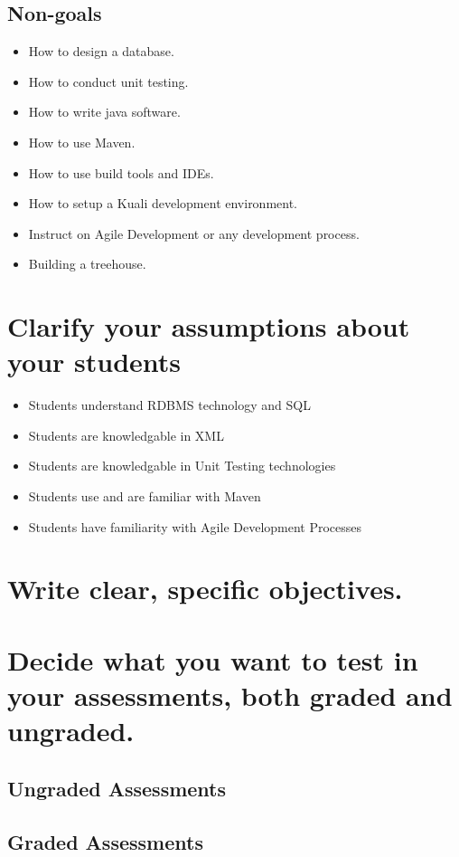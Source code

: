 \documentclass[12pt,notitlepage]{article}
\begin{document}
\subsection{Non-goals}
\begin{itemize}
\item How to design a database.
\item How to conduct unit testing.
\item How to write java software. 
\item How to use Maven.
\item How to use build tools and IDEs.
\item How to setup a Kuali development environment.
\item Instruct on Agile Development or any development process.
\item Building a treehouse.
\end{itemize}

\section{Clarify your assumptions about your students}
\begin{itemize}
\item Students understand RDBMS technology and SQL
\item Students are knowledgable in XML
\item Students are knowledgable in Unit Testing technologies
\item Students use and are familiar with Maven
\item Students have familiarity with Agile Development Processes
\end{itemize}

\section{Write clear, specific objectives.}

\section{Decide what you want to test in your assessments, both graded and ungraded.}

\subsection{Ungraded Assessments}

\subsection{Graded Assessments}
\end{document}
